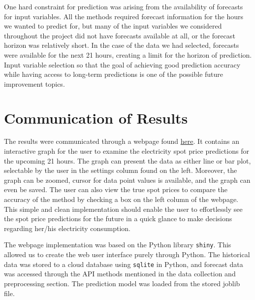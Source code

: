 \documentclass{article}
\numberwithin{equation}{section}
\begin{document}
One hard constraint for prediction was arising from the availability of forecasts for input variables. All the methods required forecast information for the hours we wanted to predict for, but many of the input variables we considered throughout the project did not have forecasts available at all, or the forecast horizon was relatively short. In the case of the data we had selected, forecasts were available for the next 21 hours, creating a limit for the horizon of prediction. Input variable selection so that the goal of achieving good prediction accuracy while having access to long-term predictions is one of the possible future improvement topics.

\section{Communication of Results}
The results were communicated through a webpage found \href{https://connect.posit.cloud/AhsanAbbas101/content/0192c52c-7101-3655-bc34-0e4733cd46de}{here}. It contains an interactive graph for the user to examine the electricity spot price predictions for the upcoming 21 hours. The graph can present the data as either line or bar plot, selectable by the user in the settings column found on the left. Moreover, the graph can be zoomed, cursor for data point values is available, and the graph can even be saved. The user can also view the true spot prices to compare the accuracy of the method by checking a box on the left column of the webpage. This simple and clean implementation should enable the user to effortlessly see the spot price predictions for the future in a quick glance to make decisions regarding her/his electricity consumption.

The webpage implementation was based on the Python library \verb|shiny|. This allowed us to create the web user interface purely through Python. The historical data was stored to a cloud database using \verb|sqlite| in Python, and forecast data was accessed through the API methods mentioned in the data collection and preprocessing section. The prediction model was loaded from the stored joblib file.




\end{document}
